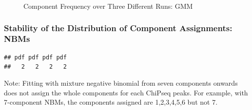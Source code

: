 \documentclass{article}\usepackage[]{graphicx}\usepackage[]{color}
\makeatletter
\newenvironment{kframe}{%
 \def\at@end@of@kframe{}%
 \ifinner\ifhmode%
  \def\at@end@of@kframe{\end{minipage}}%
  \begin{minipage}{\columnwidth}%
 \fi\fi%
 \def\FrameCommand##1{\hskip\@totalleftmargin \hskip-\fboxsep
 \colorbox{shadecolor}{##1}\hskip-\fboxsep
     \hskip-\linewidth \hskip-\@totalleftmargin \hskip\columnwidth}%
 \MakeFramed {\advance\hsize-\width
   \@totalleftmargin\z@ \linewidth\hsize
   \@setminipage}}%
 {\par\unskip\endMakeFramed%
 \at@end@of@kframe}
\newenvironment{knitrout}{}{} %
\makeatother
\begin{document}
\begin{figure}[H]
    \caption{Component Frequency over Three Different Runs: GMM}
    \label{fig:compFreqGMM}
\end{figure}      

\subsubsection{Stability of the Distribution of Component Assignments: NBMs}




\begin{knitrout}
\color{fgcolor}\begin{kframe}
\begin{verbatim}
## pdf pdf pdf pdf 
##   2   2   2   2
\end{verbatim}
\end{kframe}
\end{knitrout}

Note: Fitting with mixture negative binomial from seven components onwards does not assign the whole components for each ChiPseq peaks. For example, with 7-component NBMs, the components assigned are 1,2,3,4,5,6 but not 7. 
\end{document}
